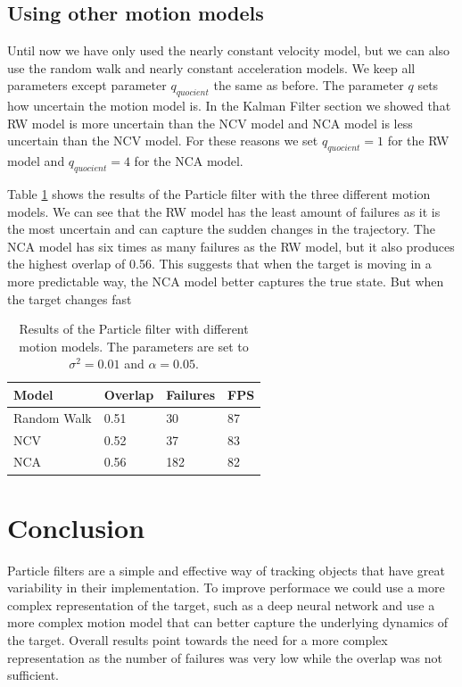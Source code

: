 \documentclass[9pt]{IEEEtran}
\begin{document}
\subsection*{Using other motion models}
Until now we have only used the nearly constant velocity model, but we can also use the random walk and nearly constant acceleration models.
We keep all parameters except parameter $q_{quocient}$ the same as before.
The parameter $q$ sets how uncertain the motion model is.
In the Kalman Filter section we showed that RW model is more uncertain than the NCV model and NCA model is less uncertain than the NCV model. 
For these reasons we set $q_{quocient} = 1$ for the RW model and $q_{quocient} = 4$ for the NCA model.

Table \ref{tab:motion} shows the results of the Particle filter with the three different motion models.
We can see that the RW model has the least amount of failures as it is the most uncertain and can capture the sudden changes in the trajectory.
The NCA model has six times as many failures as the RW model, but it also produces the highest overlap of 0.56.
This suggests that when the target is moving in a more predictable way, the NCA model better captures the true state.
But when the target changes fast 
\begin{table}[!ht]
    \centering
    \begin{tabular}{llll}
        \textbf{Model} & \textbf{Overlap} & \textbf{Failures} & \textbf{FPS} \\ \hline
        Random Walk & 0.51 & 30 & 87 \\ 
        NCV & 0.52 & 37 & 83 \\ 
        NCA & 0.56 & 182 & 82 \\ 
    \end{tabular}
    \caption{Results of the Particle filter with different motion models. The parameters are set to $\sigma^2=0.01$ and $\alpha=0.05$.}
    \label{tab:motion}
\end{table}


\section{Conclusion}
Particle filters are a simple and effective way of tracking objects that have great variability in their implementation.
To improve performace we could use a more complex representation of the target, such as a deep neural network and use a more complex motion model that can better capture the underlying dynamics of the target.
Overall results point towards the need for a more complex representation as the number of failures was very low while the overlap was not sufficient.
\end{document}
